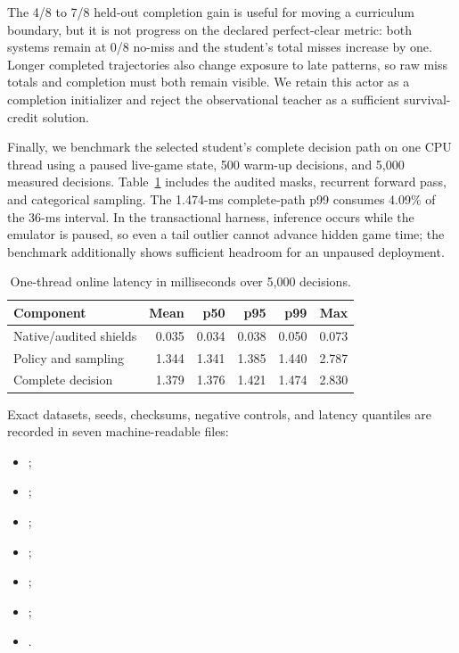 \documentclass[10pt]{article}
\begin{document}
The 4/8 to 7/8 held-out completion gain is useful for moving a curriculum
boundary, but it is not progress on the declared perfect-clear metric: both
systems remain at 0/8 no-miss and the student's total misses increase by one.
Longer completed trajectories also change exposure to late patterns, so raw
miss totals and completion must both remain visible.  We retain this actor as a
completion initializer and reject the observational teacher as a sufficient
survival-credit solution.

Finally, we benchmark the selected student's complete decision path on one CPU
thread using a paused live-game state, 500 warm-up decisions, and 5,000 measured
decisions.  Table~\ref{tab:online-latency} includes the audited masks, recurrent
forward pass, and categorical sampling.  The 1.474-ms complete-path p99 consumes
4.09\% of the 36-ms interval.  In the transactional harness, inference occurs
while the emulator is paused, so even a tail outlier cannot advance hidden game
time; the benchmark additionally shows sufficient headroom for an unpaused
deployment.

\begin{table}[ht]
  \centering
  \caption{One-thread online latency in milliseconds over 5,000 decisions.}
  \label{tab:online-latency}
  \begin{tabular}{lrrrrr}
    \toprule
    Component & Mean & p50 & p95 & p99 & Max \\
    \midrule
    Native/audited shields & 0.035 & 0.034 & 0.038 & 0.050 & 0.073 \\
    Policy and sampling & 1.344 & 1.341 & 1.385 & 1.440 & 2.787 \\
    Complete decision & 1.379 & 1.376 & 1.421 & 1.474 & 2.830 \\
    \bottomrule
  \end{tabular}
\end{table}

Exact datasets, seeds, checksums, negative controls, and latency quantiles are
recorded in seven machine-readable files:
\begin{itemize}
  \item {};
  \item {};
  \item {};
  \item {};
  \item {};
  \item {};
  \item {}.
\end{itemize}
\end{document}
